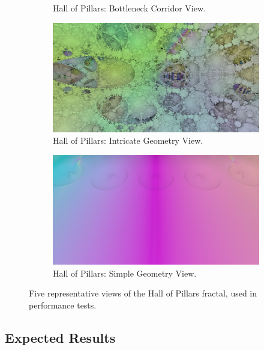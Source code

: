 \begin{figure}[ht]
\begin{subfigure}[c]{0.3\linewidth}
		\caption{Hall of Pillars: Bottleneck Corridor View.}
		\label{figure:hall-of-pillars-view-03-bottleneck-corridor}
	\end{subfigure}
	\hfill
	\begin{subfigure}[c]{0.3\linewidth}
		\includegraphics[width=\linewidth, frame]{Images/Results/Hall-Of-Pillars-View-04-Intricate-Geometry.png}
		\caption{Hall of Pillars: Intricate Geometry View.}
		\label{figure:hall-of-pillars-view-04-intricate-geometry}
	\end{subfigure}
	\hfill
	\begin{subfigure}[c]{0.3\linewidth}
		\includegraphics[width=\linewidth, frame]{Images/Results/Hall-Of-Pillars-View-05-Simple-Geometry.png}
		\caption{Hall of Pillars: Simple Geometry View.}
		\label{figure:hall-of-pillars-view-05-simple-geometry}
	\end{subfigure}

	\caption{Five representative views of the Hall of Pillars fractal, used in performance tests.}
	\label{figure:hall-of-pillars-views}
\end{figure}

\subsection{Expected Results}

